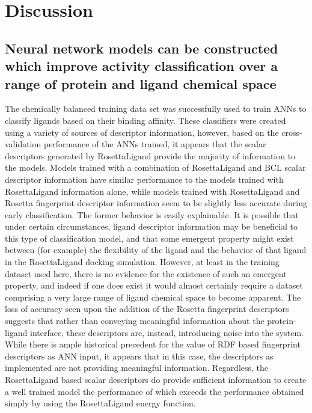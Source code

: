 \section{Discussion}

\subsection{Neural network models can be constructed which improve activity classification over a range of protein and ligand chemical space}

The chemically balanced training data set was successfully used to train ANNs to classify ligands based on their binding affinity.
These classifiers were created using a variety of sources of descriptor information, however, based on the cross-validation performance of the ANNs trained, it appears that the scalar descriptors generated by RosettaLigand provide the majority of information to the models.
Models trained with a combination of RosettaLigand and BCL scalar descriptor information have similar performance to the models trained with RosettaLigand information alone, while models trained with RosettaLigand and Rosetta fingerprint descriptor information seem to be slightly less accurate during early classification.
The former behavior is easily explainable.
It is possible that under certain circumstances, ligand descriptor information may be beneficial to this type of classification model, and that some emergent property might exist between (for example) the flexibility of the ligand and the behavior of that ligand in the RosettaLigand docking simulation.
However, at least in the training dataset used here, there is no evidence for the existence of such an emergent property, and indeed if one does exist it would almost certainly require a dataset comprising a very large range of ligand chemical space to become apparent. 
The loss of accuracy seen upon the addition of the Rosetta fingerprint descriptors suggests that rather than conveying meaningful information about the protein-ligand interface, these descriptors are, instead, introducing noise into the system.
While there is ample historical precedent\citep{Mueller:2010dx,Butkiewicz:2013ka,Hristozov:2007bz} for the value of RDF based fingerprint descriptors as ANN input, it appears that in this case, the descriptors as implemented are not providing meaningful information.
Regardless, the RosettaLigand based scalar descriptors do provide sufficient information to create a well trained model the performance of which exceeds the performance obtained simply by using the RosettaLigand energy function. 

